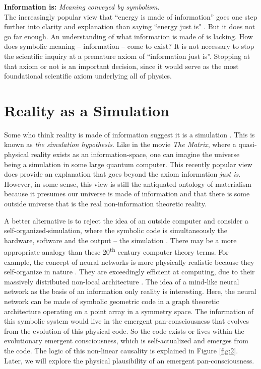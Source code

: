 \documentclass[submission,copyright,creativecommons]{eptcs}
\begin{document}
\textbf{Information is:} \textit{Meaning conveyed by symbolism.}\\

The increasingly popular view that “energy is made of information” goes one step further into clarity and explanation than saying “energy just is" \cite{rovelli2015relative}. But it does not go far enough. An understanding of what information is made of is lacking. How does symbolic meaning -- information -- come to exist? It is not necessary to stop the scientific inquiry at a premature axiom of “information just is”. Stopping at that axiom or not is an important decision, since it would serve as the most foundational scientific axiom underlying all of physics.

\section{Reality as a Simulation}
\label{sec:2}

Some who think reality is made of information suggest it is a simulation \cite{bostrom2003we}. This is known as \textit{the simulation hypothesis}. Like in the movie \textit{The Matrix}, where a quasi-physical reality exists as an information-space, one can imagine the universe being a simulation in some large quantum computer. This recently popular view does provide an explanation that goes beyond the axiom information \textit{just is}. However, in some sense, this view is still the antiquated ontology of materialism because it  presumes our universe is made of information and that there is some outside universe that is the real non-information theoretic reality.

A better alternative is to reject the idea of an outside computer and consider a self-organized-simulation, where the symbolic code is simultaneously the hardware, software and the output -- the simulation \cite{aschheim2011hacking}. There may be a more appropriate analogy than these 20\textsuperscript{th} century computer theory terms. For example, the concept of neural networks is more physically realistic because they self-organize in nature \cite{lettvin1959frog}. They are exceedingly efficient at computing, due to their massively distributed non-local architecture \cite{pizzi2004nonlocal}. The idea of a mind-like neural network as the basis of an information only reality is interesting. Here, the neural network can be made of symbolic geometric code in a graph theoretic architecture operating on a point array in a symmetry space. The information of this symbolic system would live in the emergent pan-consciousness that evolves from the evolution of this physical code. So the code exists or lives within the evolutionary emergent consciousness, which is self-actualized and emerges from the code. The logic of this non-linear causality is explained in Figure \ref{fig:2}. Later, we will explore the physical plausibility of an emergent pan-consciousness.
\end{document}
